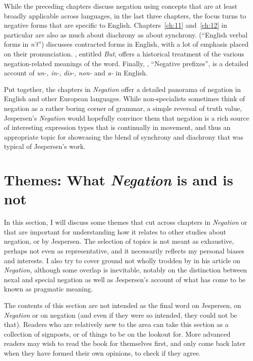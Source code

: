 \documentclass[output=chapter]{langscibook}
\begin{document}
While the preceding chapters discuss negation using concepts that are at least broadly applicable across languages, in the last three chapters, the focus turns to negative forms that are specific to English. Chapters~\ref{ch:11} and~\ref{ch:12} in particular are also as much about diachrony as about synchrony.  (``English verbal forms in \textit{n’t}'') discusses contracted forms in English, with a lot of emphasis placed on their pronunciation. , entitled \textit{But}, offers a historical treatment of the various negation-related meanings of the word. Finally, , ``Negative prefixes'', is a detailed account of \textit{un-}, \textit{in-}, \textit{dis-}, \textit{non-} and \textit{a-} in English.

Put together, the chapters in \textit{Negation} offer a detailed panorama of negation in English and other European languages. While non-specialists sometimes think of negation as a rather boring corner of grammar, a simple reversal of truth value, Jespersen’s \textit{Negation} would hopefully convince them that negation is a rich source of interesting expression types that is continually in movement, and thus an appropriate topic for showcasing the blend of synchrony and diachrony that was typical of Jespersen’s work.

\section{Themes: What \textit{Negation} is and is not}

In this section, I will discuss some themes that cut across chapters in \textit{Negation} or that are important for understanding how it relates to other studies about negation, or by Jespersen. The selection of topics is not meant as exhaustive, perhaps not even as representative, and it necessarily reflects my personal biases and interests. I also try %
to cover ground not wholly trodden by \citet{McCawley1995} in his article on \textit{Negation}, although some overlap is inevitable, notably on the distinction between nexal and special negation as well as Jespersen’s account of what has come to be known as pragmatic meaning.

The contents of this section are not intended as the final word on Jespersen, on \textit{Negation} or on negation (and even if they were so intended, they could not be that). Readers who are relatively new to the area can take this section as a collection of signposts, or of things to be on the lookout for. More advanced readers may wish to read the book for themselves first, and only come back later when they have formed their own opinions, to check if they agree.
\end{document}
